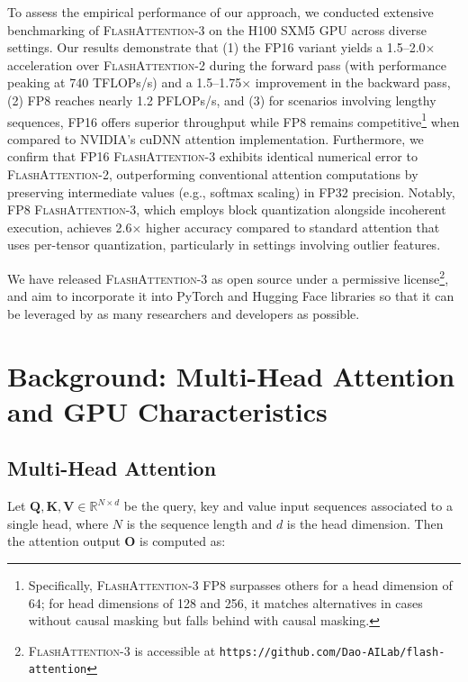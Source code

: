 To assess the empirical performance of our approach, we conducted extensive benchmarking of \textsc{FlashAttention-3} on the H100 SXM5 GPU across diverse settings. Our results demonstrate that (1) the FP16 variant yields a 1.5–2.0$\times$ acceleration over \textsc{FlashAttention-2} during the forward pass (with performance peaking at 740 TFLOPs/s) and a 1.5–1.75$\times$ improvement in the backward pass, (2) FP8 reaches nearly 1.2 PFLOPs/s, and (3) for scenarios involving lengthy sequences, FP16 offers superior throughput while FP8 remains competitive\footnote{Specifically, \textsc{FlashAttention-3} FP8 surpasses others for a head dimension of 64; for head dimensions of 128 and 256, it matches alternatives in cases without causal masking but falls behind with causal masking.} when compared to NVIDIA's cuDNN attention implementation. Furthermore, we confirm that FP16 \textsc{FlashAttention-3} exhibits identical numerical error to \textsc{FlashAttention-2}, outperforming conventional attention computations by preserving intermediate values (e.g., softmax scaling) in FP32 precision. Notably, FP8 \textsc{FlashAttention-3}, which employs block quantization alongside incoherent execution, achieves 2.6$\times$ higher accuracy compared to standard attention that uses per-tensor quantization, particularly in settings involving outlier features.

We have released \textsc{FlashAttention-3} as open source under a permissive license\footnote{\textsc{FlashAttention-3}
  is accessible at \texttt{https://github.com/Dao-AILab/flash-attention}}, and aim to incorporate it into PyTorch and Hugging Face libraries so that it can be leveraged by as many researchers and developers as possible.

\section{Background: Multi-Head Attention and GPU Characteristics}
\label{sec:background}

\subsection{Multi-Head Attention}
\label{subsec:multi_head_attn}

Let $\mathbf{Q}, \mathbf{K}, \mathbf{V} \in \mathbb{R}^{N \times d}$ be the query, key and value input sequences associated to a single head, where $N$ is the sequence length and $d$ is the head dimension. Then the attention output $\mathbf{O}$ is computed as:

